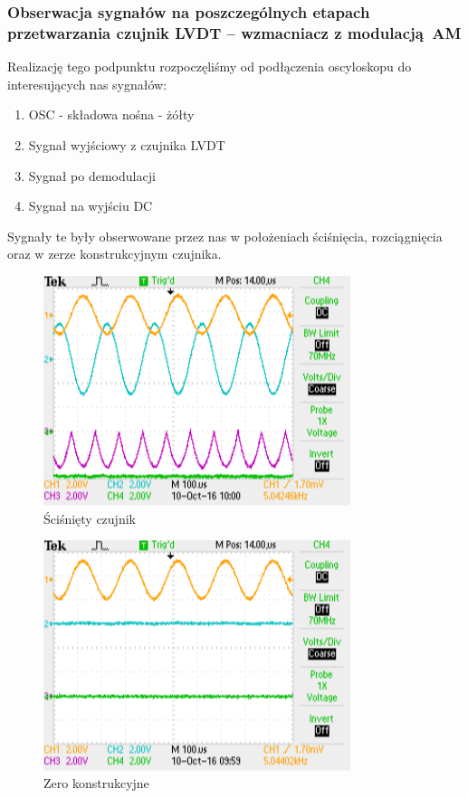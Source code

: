 \documentclass[a4paper, 12pt, titlepage]{article}
\begin{document}
			\subsubsection{Obserwacja sygnałów na poszczególnych etapach przetwarzania czujnik LVDT -- wzmacniacz z modulacją AM}
				Realizację tego podpunktu rozpoczęliśmy od podłączenia oscyloskopu do interesujących nas sygnałów:
				\begin{enumerate}
					\item OSC - składowa nośna - żółty
					\item Sygnał wyjściowy z czujnika LVDT
					\item Sygnał po demodulacji
					\item Sygnał na wyjściu DC
				\end{enumerate}
				Sygnały te były obserwowane przez nas w położeniach ściśnięcia, rozciągnięcia oraz w zerze konstrukcyjnym czujnika.
				\begin{figure}[H]
					\centering
					\includegraphics[width=0.8\textwidth]{./img/scisniete.png}
					\caption{\small{Ściśnięty czujnik}}
				\end{figure} \noindent
				\begin{figure}[H]
					\centering
					\includegraphics[width=0.8\textwidth]{./img/punkt_neutralny.png}
					\caption{\small{Zero konstrukcyjne}}
				\end{figure} \noindent
\end{document}
